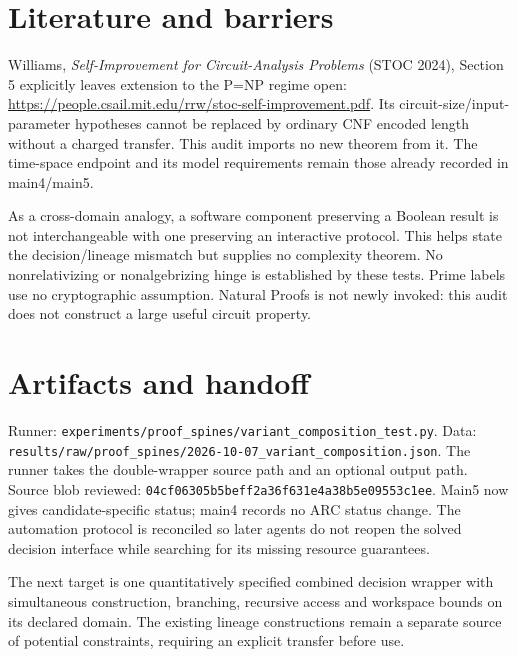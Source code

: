 \documentclass[11pt]{article}
\begin{document}
\section*{Literature and barriers}
Williams, \emph{Self-Improvement for Circuit-Analysis Problems} (STOC 2024),
Section 5 explicitly leaves extension to the P=NP regime open:
\url{https://people.csail.mit.edu/rrw/stoc-self-improvement.pdf}.
Its circuit-size/input-parameter hypotheses cannot be replaced by ordinary CNF
encoded length without a charged transfer. This audit imports no new theorem
from it. The time-space endpoint and its model requirements remain those already
recorded in main4/main5.

As a cross-domain analogy, a software component preserving a Boolean result is
not interchangeable with one preserving an interactive protocol. This helps
state the decision/lineage mismatch but supplies no complexity theorem.
No nonrelativizing or nonalgebrizing hinge is established by these tests. Prime
labels use no cryptographic assumption. Natural Proofs is not newly invoked:
this audit does not construct a large useful circuit property.

\section*{Artifacts and handoff}
Runner: \texttt{experiments/proof\_spines/variant\_composition\_test.py}.
Data: \texttt{results/raw/proof\_spines/2026-10-07\_variant\_composition.json}.
The runner takes the double-wrapper source path and an optional output path.
Source blob reviewed: \texttt{04cf06305b5beff2a36f631e4a38b5e09553c1ee}.
Main5 now gives candidate-specific status; main4 records no ARC status change.
The automation protocol is reconciled so later agents do not reopen the solved
decision interface while searching for its missing resource guarantees.

The next target is one quantitatively specified combined decision wrapper with
simultaneous construction, branching, recursive access and workspace bounds on
its declared domain. The existing lineage constructions remain a separate
source of potential constraints, requiring an explicit transfer before use.
\end{document}
